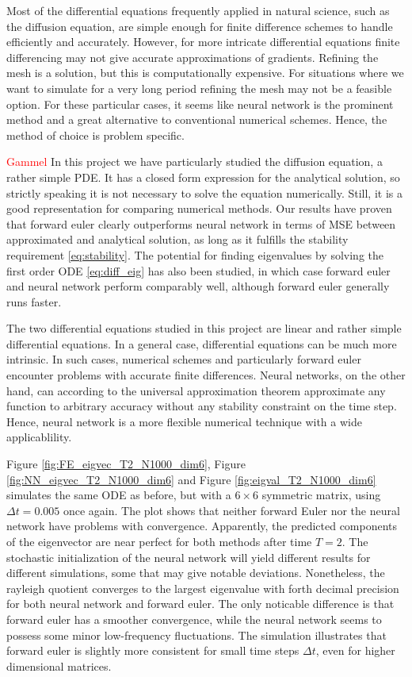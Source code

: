 \documentclass[12pt]{extarticle}
\begin{document}
Most of the differential equations frequently applied in natural science, such as the diffusion equation, are simple enough for finite difference schemes to handle efficiently and accurately. However, for more intricate differential equations finite differencing may not give accurate approximations of gradients. Refining the mesh is a solution, but this is computationally expensive. For situations where we want to simulate for a very long period refining the mesh may not be a feasible option. For these particular cases, it seems like neural network is the prominent method and a great alternative to conventional numerical schemes. Hence, the method of choice is problem specific. 

\textcolor{red}{Gammel}
In this project we have particularly studied the diffusion equation, a rather simple PDE. It has a closed form expression for the analytical solution, so strictly speaking it is not necessary to solve the equation numerically. Still, it is a good representation for comparing numerical methods. Our results have proven that forward euler clearly outperforms neural network in terms of MSE between approximated and analytical solution, as long as it fulfills the stability requirement \eqref{eq:stability}. The potential for finding eigenvalues by solving the first order ODE \eqref{eq:diff_eig} has also been studied, in which case forward euler and neural network perform comparably well, although forward euler generally runs faster. 

The two differential equations studied in this project are linear and rather simple differential equations. In a general case, differential equations can be much more intrinsic. In such cases, numerical schemes and particularly forward euler encounter problems with accurate finite differences. Neural networks, on the other hand, can according to the universal approximation theorem approximate any function to arbitrary accuracy without any stability constraint on the time step. Hence, neural network is a more flexible numerical technique with a wide applicablility.

Figure \ref{fig:FE_eigvec_T2_N1000_dim6}, Figure \ref{fig:NN_eigvec_T2_N1000_dim6} and Figure \ref{fig:eigval_T2_N1000_dim6} simulates the same ODE as before, but with a $6\times 6$ symmetric matrix, using $\Delta t=0.005$ once again. The plot shows that neither forward Euler nor the neural network have problems with convergence. Apparently, the predicted components of the eigenvector are near perfect for both methods after time $T=2$. The stochastic initialization of the neural network will yield different results for different simulations, some that may give notable deviations. Nonetheless, the rayleigh quotient converges to the largest eigenvalue with forth decimal precision for both neural network and forward euler. The only noticable difference is that forward euler has a smoother convergence, while the neural network seems to possess some minor low-frequency fluctuations. The simulation illustrates that forward euler is slightly more consistent for small time steps $\Delta t$, even for higher dimensional matrices.
\end{document}
